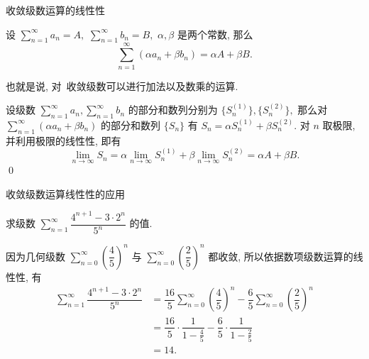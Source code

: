 
\begin{frame}{收敛级数运算的线性性}

\begin{thm}[收敛级数运算的线性性]
设 $\sum\limits_{n=1}^\infty a_n = A,$ $\sum\limits_{n=1}^\infty b_n = B,$ $\alpha, \beta$ 是两个常数, 那么
\[\sum\limits_{n=1}^\infty (\alpha a_n + \beta b_n) = \alpha A + \beta B.\]
\end{thm}

也就是说, 对~{\color{red}收敛级数}可以进行加法以及数乘的运算.

\pause
\vspace{0.5em}

\startproof[bg=yellow, fg=red]
设级数 $\sum\limits_{n=1}^\infty a_n, \sum\limits_{n=1}^\infty b_n$ 的部分和数列分别为 $\{S_n^{(1)}\}, \{S_n^{(2)}\},$ 那么对 $\sum\limits_{n=1}^\infty (\alpha a_n + \beta b_n)$ 的部分和数列 $\{S_n\}$ 有 $S_n = \alpha S_n^{(1)} + \beta S_n^{(2)}.$ 对 $n$ 取极限, 并利用极限的线性性, 即有
\[\lim\limits_{n\to\infty} S_n = \alpha \lim\limits_{n\to\infty} S_n^{(1)} + \beta \lim\limits_{n\to\infty} S_n^{(2)} = \alpha A + \beta B.\]
\qed

\end{frame}


\begin{frame}{收敛级数运算线性性的应用}

\begin{eg}
\begin{center}
求级数 $\sum\limits_{n=1}^\infty \dfrac{4^{n+1} - 3 \cdot 2^n}{5^n}$ 的值.
\end{center}
\end{eg}

\pause
\vspace*{0.5em}

因为几何级数 $\sum\limits_{n=0}^\infty \left( \dfrac{4}{5} \right)^n$ 与 $\sum\limits_{n=0}^\infty \left( \dfrac{2}{5} \right)^n$ 都收敛, 所以依据数项级数运算的线性性, 有
\begin{align*}
\sum\limits_{n=1}^\infty \dfrac{4^{n+1} - 3 \cdot 2^n}{5^n} & = \dfrac{16}{5} \sum\limits_{n=0}^\infty \left( \dfrac{4}{5} \right)^n - \dfrac{6}{5} \sum\limits_{n=0}^\infty \left( \dfrac{2}{5} \right)^n \\
& = \dfrac{16}{5} \cdot \dfrac{1}{1 - \frac{4}{5}} - \dfrac{6}{5} \cdot \dfrac{1}{1 - \frac{2}{5}} \\
& = 14.
\end{align*}

\end{frame}

